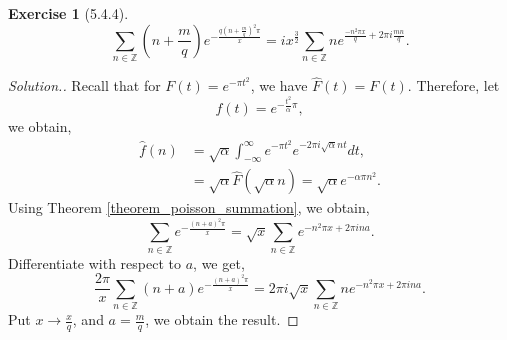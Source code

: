\documentclass{article}
\newtheorem{exercise}{Exercise}[section]
\newcommand{\Z}[0]{\mathbb{Z}}
\begin{document}
\begin{exercise}[5.4.4]
  \begin{equation*}
    \sum_{n\in\Z}\left(n+{\frac m q}\right)e^{-{\frac {q\left(n+{\frac m q}\right)^2\pi} {x}}} = ix^{{\frac 3 2}}\sum_{n\in \Z}ne^{{\frac {-n^2\pi x} {q}}+2\pi i{\frac {mn} q}}.
  \end{equation*}
\end{exercise}
\begin{proof}[Solution.]
  Recall that for $F(t) = e^{-\pi t^2}$, we have $\hat{F}(t) = F(t)$. Therefore, let 
  \begin{equation*}
    f(t) = e^{-{\frac {t^2} \alpha}\pi},
  \end{equation*}
  we obtain,
  \begin{align*}
    \hat{f}(n) & = \sqrt{\alpha}\int_{-\infty}^\infty e^{-\pi t^2}e^{-2\pi i\sqrt{\alpha}nt}dt,\\
    & = \sqrt{\alpha}\hat{F}(\sqrt{\alpha} n) = \sqrt{\alpha}e^{-\alpha\pi n^2}.
  \end{align*}
  Using Theorem \ref{theorem_poisson_summation}, we obtain,
  \begin{equation*}
    \sum_{n\in\Z}e^{-{\frac {(n+a)^2\pi} {x}}} = \sqrt{x}\sum_{n\in \Z}e^{-n^2\pi x+2\pi ina}.
  \end{equation*}
  Differentiate with respect to $a$, we get,
\begin{equation*}
    {\frac {2\pi} {x}}\sum_{n\in\Z}(n+a)e^{-{\frac {(n+a)^2\pi} {x}}} = 2\pi i\sqrt{x}\sum_{n\in \Z}ne^{-n^2\pi x+2\pi ina}.
  \end{equation*}
  Put $x\to {\frac x q}$, and $a = {\frac m q}$, we obtain the result.
\end{proof}
\end{document}
